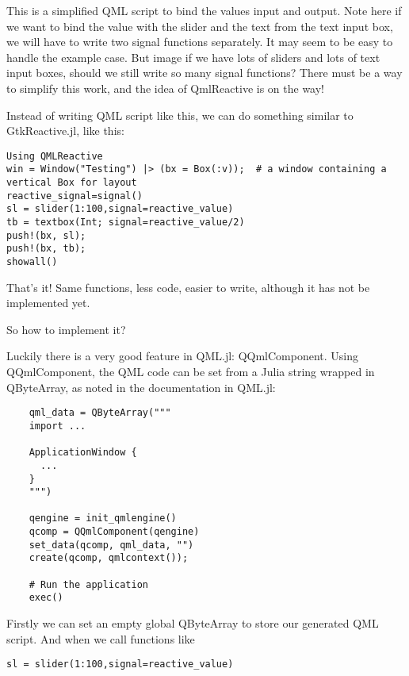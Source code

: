 \documentclass[12pt]{extarticle}
\begin{document}
This is a simplified QML script to bind the values input and output. Note here if we want to bind the value with the slider and the text from the 
text input box, we will have to write two signal functions separately. It may seem to be easy to handle the example case. But image if we have lots of sliders and lots 
of text input boxes, should we still write so many signal functions?  There 
must be a way to simplify this work, and the idea of QmlReactive is on the way!

Instead of writing QML script like this, we can do something similar to GtkReactive.jl, like this:

\begin{verbatim}
Using QMLReactive
win = Window("Testing") |> (bx = Box(:v));  # a window containing a vertical Box for layout
reactive_signal=signal()
sl = slider(1:100,signal=reactive_value)
tb = textbox(Int; signal=reactive_value/2)
push!(bx, sl); 
push!(bx, tb);
showall() 
\end{verbatim}

That's it! Same functions, less code, easier to write, although it has not be implemented yet.

So how to implement it? 

Luckily there is a very good feature in QML.jl: QQmlComponent. Using QQmlComponent, the QML code can be set from a Julia string wrapped 
in QByteArray, as noted in the documentation in QML.jl:
\begin{verbatim}
    qml_data = QByteArray("""
    import ...
    
    ApplicationWindow {
      ...
    }
    """)
    
    qengine = init_qmlengine()
    qcomp = QQmlComponent(qengine)
    set_data(qcomp, qml_data, "")
    create(qcomp, qmlcontext());
    
    # Run the application
    exec()
\end{verbatim}

Firstly we can set an empty global QByteArray to store our generated QML script. And when we call functions like 
\begin{verbatim}
sl = slider(1:100,signal=reactive_value)
\end{verbatim}
\end{document}
